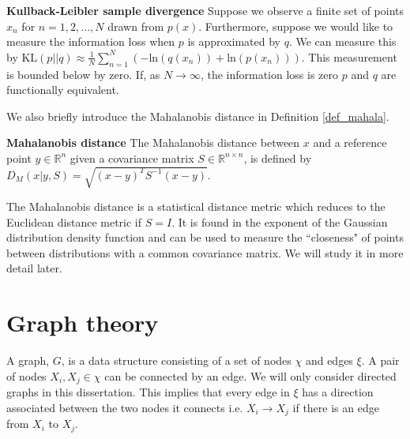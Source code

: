\begin{thrm}
\textbf{Kullback-Leibler sample divergence} Suppose we observe a finite set of points $x_n$ for $n=1,2,..., N$ drawn from $p(x)$. Furthermore, suppose we would like to measure the information loss when $p$ is approximated by $q$. We can measure this by $\text{KL}(p||q) \approx \frac{1}{N}\sum_{n=1}^N\left(-\text{ln}(q(x_n)) + \text{ln}(p(x_n))\right)$. This measurement is bounded below by zero. If, as $N \rightarrow \infty$, the information loss is zero $p$ and $q$ are functionally equivalent.
\label{thrm_kl_sample}
\end{thrm}
We also briefly introduce the Mahalanobis distance in Definition \ref{def_mahala}.
\begin{defn}
\textbf{Mahalanobis distance} The Mahalanobis distance between $x$ and a reference point $y \in \mathbb{R}^n$ given a covariance matrix $S \in \mathbb{R}^{n\times
n}$, is defined by $D_M(x|y, S) = \sqrt{(x-y)^TS^{-1}(x-y)}$. 
\label{def_mahala}
\end{defn}
The Mahalanobis distance is a statistical distance metric which reduces to the Euclidean distance metric if $S=I$. It is found in the exponent of the Gaussian distribution density function and can be used to measure the ``closeness" of points between distributions with a common covariance matrix. We will study it in more detail later.
\section{Graph theory}
\label{sec_graph_theory}
A graph, $G$, is a data structure consisting of a set of nodes $\chi$ and edges $\xi$. A pair of nodes $X_i, X_j \in \chi$ can be connected by an edge. We will only consider directed graphs in this dissertation. This implies that every edge in $\xi$ has a direction associated between the two nodes it connects i.e. $X_i \rightarrow X_j$ if there is an edge from $X_i$ to $X_j$.

